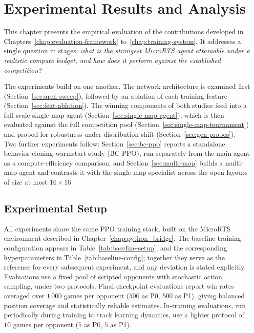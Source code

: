 \chapter{Experimental Results and Analysis}
\label{chap:results}

This chapter presents the empirical evaluation of the contributions developed in Chapters~\ref{chap:evaluation-framework} to~\ref{chap:training-system}. It addresses a single question in stages: \emph{what is the strongest MicroRTS agent attainable under a realistic compute budget, and how does it perform against the established competition?}

The experiments build on one another. The network architecture is examined first (Section~\ref{sec:arch-sweep}), followed by an ablation of each training feature (Section~\ref{sec:feat-ablation}). The winning components of both studies feed into a full-scale single-map agent (Section~\ref{sec:single-map-agent}), which is then evaluated against the full competition pool (Section~\ref{sec:single-map-tournament}) and probed for robustness under distribution shift (Section~\ref{sec:gen-probes}). Two further experiments follow: Section~\ref{sec:bc-ppo} reports a standalone behavior-cloning warmstart study (BC-PPO), run separately from the main agent as a compute-efficiency comparison, and Section~\ref{sec:multi-map} builds a multi-map agent and contrasts it with the single-map specialist across the open layouts of size at most $16{\times}16$.
  
\vspace*{-0.1cm}

\section{Experimental Setup}
\label{sec:experimental-setup}

All experiments share the same PPO training stack, built on the MicroRTS environment described in Chapter~\ref{chap:python_bridge}. The baseline training configuration appears in Table~\ref{tab:baseline-setup}, and the corresponding hyperparameters in Table~\ref{tab:baseline-config}; together they serve as the reference for every subsequent experiment, and any deviation is stated explicitly. Evaluations use a fixed pool of scripted opponents with stochastic action sampling, under two protocols. Final checkpoint evaluations report win rates averaged over $1\,000$ games per opponent ($500$ as P0, $500$ as P1), giving balanced position coverage and statistically reliable estimates. In-training evaluations, run periodically during training to track learning dynamics, use a lighter protocol of $10$ games per opponent ($5$ as P0, $5$ as P1).

